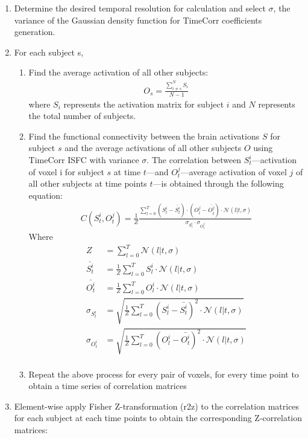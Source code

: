 \documentclass[11pt]{article}
\begin{document}
\begin{enumerate}
\item Determine the desired temporal resolution for calculation and select $\sigma$, the variance of the Gaussian density function for TimeCorr coefficients generation.
\item For each subject s,
\begin{enumerate}
\item Find the average activation of all other subjects:
\begin{align*}
O_s=\frac{\sum_{i\neq s}^N S_i}{N-1}
\end{align*}
where $S_i$ represents the activation matrix for subject $i$ and $N$ represents the total number of subjects.
\item Find the functional connectivity between the brain activations $S$ for subject $s$ and the average activations of all other subjects $O$ using TimeCorr ISFC with variance $\sigma$. The correlation between $S^i_t$---activation of voxel i for subject $s$ at time $t$---and $O^j_t$---average activation of voxel $j$ of all other subjects at time points $t$---is obtained through the following equation:
\begin{align*}
C(S^i_t,O^j_t) = \frac{1}{Z}\frac{\sum_{l=0}^T (S_l^i - \bar{S^i_t})\cdot(O^j_l - \bar{O^j_t})\cdot \mathcal{N}(l|t,\sigma)}{\sigma_{S_t^i} \cdot \sigma_{O_t^j}}
\end{align*}
Where
\begin{align*}
Z &= \sum_{l=0}^T \mathcal{N}(l|t,\sigma)\\
\bar{S^i_t} &=\frac{1}{Z} \sum_{l=0}^T S^i_l \cdot \mathcal{N}(l|t,\sigma)\\
\bar{O^i_t} &=\frac{1}{Z} \sum_{l=0}^T O^i_l \cdot \mathcal{N}(l|t,\sigma)\\
\sigma_{S_t^i} &=\sqrt{ \frac{1}{Z}\sum_{l=0}^T (S_l^i-\bar{S_t^i})^2 \cdot \mathcal{N}(l|t,\sigma)}\\
\sigma_{O_t^i} &=\sqrt{ \frac{1}{Z}\sum_{l=0}^T (O_l^i-\bar{O_t^i})^2 \cdot \mathcal{N}(l|t,\sigma)}\\
\end{align*}
\item Repeat the above process for every pair of voxels, for every time point to obtain a time series of correlation matrices
\end{enumerate}
\item Element-wise apply Fisher Z-transformation (r2z) to the correlation matrices for each subject at each time points to obtain the corresponding Z-correlation matrices:

\end{enumerate}
\end{document}
